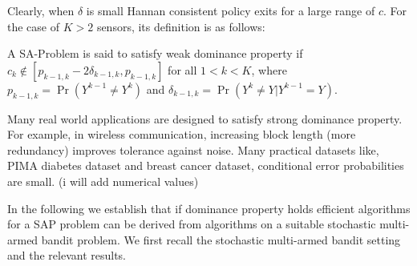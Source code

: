 Clearly, when $\delta$ is small Hannan consistent policy exits for a large range of $c$. For the case of $K>2$ sensors, its definition is as follows: 

\begin{definition}
	A SA-Problem is said to satisfy weak dominance property if $c_k \notin [p_{k-1,k}-2\delta_{k-1,k}, p_{k-1,k}]$ for all $1<k<K$, where $p_{k-1,k}=\Pr(Y^{k-1}\neq Y^k)$ and $\delta_{k-1,k}=\Pr(Y^k\neq Y| Y^{k-1}=Y).$
\end{definition}

Many real world applications are designed to satisfy strong dominance property. For example, in wireless communication, increasing block length (more redundancy) improves tolerance against noise. Many practical datasets like, PIMA diabetes dataset and breast cancer dataset, conditional error probabilities are small.   (i will add numerical values)

In the following we establish that if dominance property holds efficient algorithms for a SAP problem can be derived from algorithms on a suitable stochastic multi-armed bandit problem. We first recall the stochastic multi-armed bandit setting and the relevant results. 

